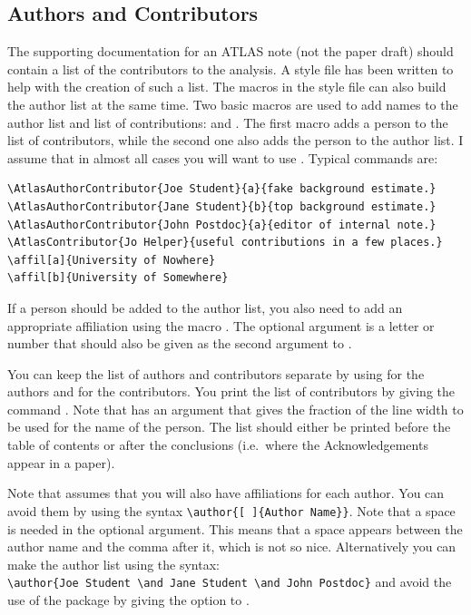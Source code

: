 \subsection{Authors and Contributors}
\label{sec:contribute}

The supporting documentation for an ATLAS note (not the paper draft) should contain a list of the contributors to the analysis.
A style file  has been written to help with the creation of such a list.
The macros in the style file can also build the author list at the same time.
Two basic macros are used to add names to the author list and list of contributions:
 and . 
The first macro adds a person to the list of contributors, while the second one also adds the person
to the author list. I assume that in almost all cases you will want to use .
Typical commands are:
\begin{verbatim}
\AtlasAuthorContributor{Joe Student}{a}{fake background estimate.}
\AtlasAuthorContributor{Jane Student}{b}{top background estimate.}
\AtlasAuthorContributor{John Postdoc}{a}{editor of internal note.}
\AtlasContributor{Jo Helper}{useful contributions in a few places.}
\affil[a]{University of Nowhere}
\affil[b]{University of Somewhere}
\end{verbatim}
If a person should be added to the author list, you also need to add an appropriate affiliation using the macro .
The optional argument is a letter or number that should also be given as the second argument to
.

You can keep the list of authors and contributors separate
by using  for the authors and  for the contributors.
You print the list of contributors by giving the command .
Note that  has an argument that gives the fraction of the line width
to be used for the name of the person.
The list should either be printed before the table of contents or after the conclusions
(i.e.\ where the Acknowledgements appear in a paper).

Note that  assumes that you will also have affiliations for each author.
You can avoid them by using the syntax \verb|\author{[ ]{Author Name}}|.
Note that a space is needed in the optional argument.
This means that a space appears between the author name and the comma after it, which is not so nice.
Alternatively you can make the author list using the syntax:\\
\verb|\author{Joe Student \and Jane Student \and John Postdoc}| and avoid the use of the
 package by giving the option  to .

